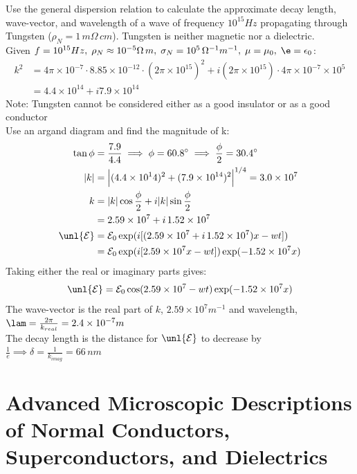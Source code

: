 \documentclass[a4paper, 11pt, normalem]{report}
\renewcommand\E{\mathcal{E}}
\newcommand\uE{\unl{\E}}
\newcommand\eno{\epsilon_0}
\begin{document}
\begin{example}
Use the general dispersion relation to calculate the approximate decay length, wave-vector, and wavelength of a wave of frequency $10^{15}Hz$ propagating through Tungsten ($\rho_N = 1\,m\Omega\,cm$).
Tungsten is neither magnetic nor a dielectric. \\
Given $f = 10^{15}Hz,\;\rho_N \approx 10^{-5}\Omega\,m,\;\sigma_N = 10^5\,\Omega^{-1}m^{-1},\;\mu=\mu_0,\;\e=\eno$:
\begin{align}
    k^2 &= 4\pi\times10^{-7}\cdot8.85\times10^{-12}\cdot(2\pi\times10^{15})^2 + i(2\pi\times10^{15})\cdot4\pi\times10^{-7}\times10^5 \\
    &= 4.4\times10^{14} + i7.9\times10^{14}
\end{align}
Note: Tungsten cannot be considered either as a good insulator or as a good conductor \\
Use an argand diagram and find the magnitude of k:
\begin{align}
    \tan\phi &= \frac{7.9}{4.4} \implies \phi = 60.8^\circ \implies \frac{\phi}{2} = 30.4^\circ \\
    |k| &= \Big|(4.4\times10^14)^2 + (7.9\times10^{14})^2\Big|^{1/4} = 3.0\times10^7 \\
    k &= |k|\cos\frac{\phi}{2} + i|k|\sin\frac{\phi}{2} \\
    &= 2.59\times10^7 + i\,1.52\times10^7 \\
    \uE &= \E_0 \exp(i[(2.59\times10^7 + i\,1.52\times10^7)x - wt]) \\
    &= \E_0 \exp(i[2.59\times10^7x - wt])\exp(-1.52\times10^7x)
\end{align}
Taking either the real or imaginary parts gives:
\begin{equation}
    \uE = \E_0 \cos(2.59\times10^7 - wt)\exp(-1.52\times10^7x)
\end{equation}
The wave-vector is the real part of $k$, $2.59\times10^7m^{-1}$ and wavelength, $\lam = \frac{2\pi}{k_{real}} = 2.4\times10^{-7}m$ \\
The decay length is the distance for $\uE$ to decrease by $\frac{1}{e} \implies \delta = \frac{1}{k_{imag}} = 66\,nm$
\end{example}

\section{Advanced Microscopic Descriptions of Normal Conductors, Superconductors, and Dielectrics}
\end{document}
